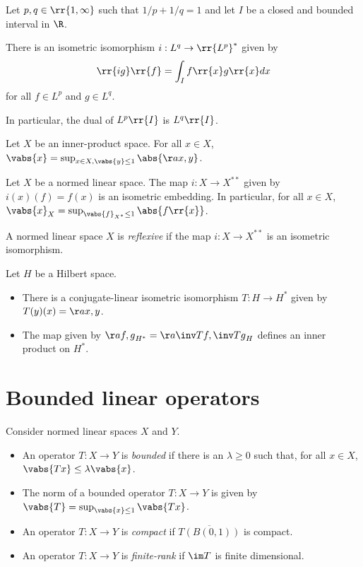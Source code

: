 \documentclass{article}
\begin{document}
\begin{theorem}
  Let $p,q\in\rr{1,\infty}$ such that $1/p+1/q = 1$ and let $I$ be a closed
  and bounded interval in $\R$.

  There is an isometric isomorphism $i:L^q\to \rr{L^p}^*$ given by
  \begin{align*}
    \rr{ig}\rr{f} = \int_I f\rr{x}g \rr{x} dx
  \end{align*}
  for all $f\in L^p$ and $g\in L^q$.

  In particular, the dual of $L^p\rr{I}$ is $L^q\rr{I}$.
\end{theorem}

\begin{lemma}
  Let $X$ be an inner-product space. For all $x\in X$, $\vabs{x}=\sup_{x\in X,\vabs{y}\leq 1} \abs{\aa{x,y}}$.
\end{lemma}

\begin{theorem}
  Let $X$ be a normed linear space. The map $i:X\to X^{**}$ given by
  $i(x)(f) = f(x)$ is an isometric embedding. In particular, for all $x\in X$,
  $\vabs{x}_{X}=\sup_{\vabs{f}_{X^*}\leq 1}\abs{f\rr{x}}$.
\end{theorem}

\begin{definition}
  A normed linear space $X$ is \emph{reflexive} if the
  map $i:X\to X^{**}$ is an isometric isomorphism.
\end{definition}

\begin{theorem}
  Let $H$ be a Hilbert space.
  \begin{itemize}
    \item There is a conjugate-linear isometric
      isomorphism $T:H\to H^*$ given by $T(y)(x) = \aa{x,y}$.
    \item The map given by $\aa{f,g}_{H^*}=\aa{\inv Tf,\inv Tg}_H$ defines an
      inner product on $H^*$.
  \end{itemize}
\end{theorem}


\section{Bounded linear operators}

\begin{definition}
  Consider normed linear spaces $X$ and $Y$.
  \begin{itemize}
    \item An operator $T:X\to Y$ is \emph{bounded} if there is an $\lambda\geq 0$ such that, for all $x\in X$, $\vabs{Tx}\leq \lambda\vabs{x}$.
    \item The norm of a bounded operator $T:X\to Y$ is given by
      $\vabs{T}=\sup_{\vabs{x}\leq 1}\vabs{T x}$.
    \item An operator $T:X\to Y$ is \emph{compact} if
      $\overline{T(B(0,1))}$ is compact.
    \item An operator $T:X\to Y$ is \emph{finite-rank} if $\im T$ is
      finite dimensional.
  \end{itemize}
\end{definition}
\end{document}
